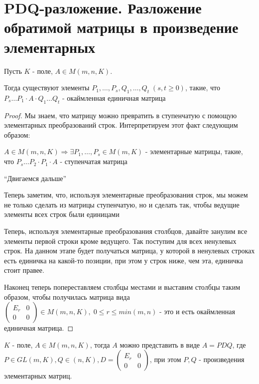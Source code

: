 \section{PDQ-разложение. Разложение обратимой матрицы в произведение элементарных}
\begin{theorem2}
    Пусть $K$ - поле, $A \in M(m, n, K)$.

    Тогда существуют элементы 
    $P_1, \dots, P_s, Q_1, \dots, Q_t \; (s,t \geqslant 0)$, такие, что 
    $P_s \dots P_1 \cdot A \cdot Q_1 \dots Q_t$ - окаймленная единичная матрица

    \begin{proof}
        Мы знаем, что матрицу можно превратить в ступенчатую с помощую элементарных преобразований строк.
        Интерпретируем этот факт следующим образом: 

        $A \in M(m, n, K) \Longrightarrow \exists P_1, \dots, P_s \in M(m, K)$ - элементарные матрицы, такие, что 
        $P_s \dots P_2 \cdot P_1 \cdot A$ - ступенчатая матрица

        ``Двигаемся дальше''

        Теперь заметим, что, используя элементарные преобразования строк, мы можем не только 
        сделать из матрицы ступенчатую, но и сделать так, чтобы ведущие элементы всех строк были единицами

        Теперь, используя элементарные преобразования столбцов, давайте занулим все элементы первой строки кроме 
        ведущего. Так поступим для всех ненулевых строк. На данном этапе будет получаться матрица,
        у которой в ненулевых строках есть единичка на какой-то позиции, при этом у строк ниже, чем эта, единичка стоит правее.

        Наконец теперь попереставляем столбцы местами и выставим столбцы таким образом, чтобы 
        получилась матрица вида
        $\begin{pmatrix}
            E_r & 0 \\
            0 & 0
        \end{pmatrix} \in M(m, n, K), \; 0 \leqslant r \leqslant min(m, n)$ - это и есть окаймленная 
        единичная матрица.
    \end{proof}
\end{theorem2}

\follow \; $K$ - поле, $A \in M(m, n, K)$, тогда $A$ можно представить в виде $A = PDQ$, где
$P \in GL(m, K), Q \in (n, K), D = \begin{pmatrix}
    E_r & 0 \\
    0 & 0
\end{pmatrix}$, при этом $P, Q$ - произведения элементарных матриц.

